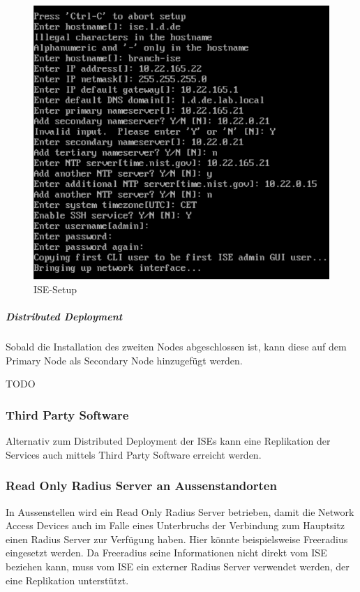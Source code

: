 \begin{figure}[H]
	\centering
	\includegraphics[width=0.8\linewidth]{img/Absicherung/ISE-Setup.png}
	\caption{ISE-Setup}
	\label{fig:ISE-Setup}
\end{figure}

\subparagraph{Distributed Deployment}

Sobald die Installation des zweiten Nodes abgeschlossen ist, kann diese auf dem Primary Node als Secondary Node hinzugefügt werden.

TODO

\subsubsection{Third Party Software}

Alternativ zum Distributed Deployment der ISEs kann eine Replikation der Services auch mittels Third Party Software erreicht werden. 

\subsubsection{Read Only Radius Server an Aussenstandorten}

In Aussenstellen wird ein Read Only Radius Server betrieben, damit die Network Access Devices auch im Falle eines Unterbruchs der Verbindung zum Hauptsitz einen Radius Server zur Verfügung haben. Hier könnte beispielsweise Freeradius eingesetzt werden. Da Freeradius seine Informationen nicht direkt vom ISE beziehen kann, muss vom ISE ein externer Radius Server verwendet werden, der eine Replikation unterstützt. 


